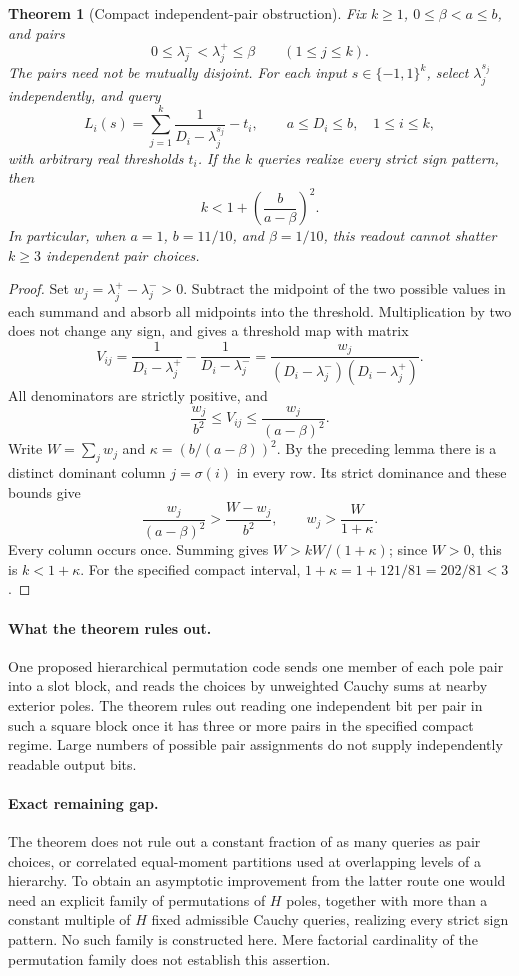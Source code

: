 \documentclass[11pt]{article}
\newtheorem{theorem}{Theorem}
\begin{document}
\begin{theorem}[Compact independent-pair obstruction]
Fix $k\geq1$, $0\leq\beta<a\leq b$, and pairs
\[
 0\leq\lambda_j^-<\lambda_j^+\leq\beta
 \qquad(1\leq j\leq k).
\]
The pairs need not be mutually disjoint. For each input
$s\in\{-1,1\}^k$, select $\lambda_j^{s_j}$ independently, and query
\[
 L_i(s)=\sum_{j=1}^k\frac{1}{D_i-\lambda_j^{s_j}}-t_i,
 \qquad a\leq D_i\leq b,\quad 1\leq i\leq k,
\]
with arbitrary real thresholds $t_i$. If the $k$ queries realize every
strict sign pattern, then
\[
 k<1+\left(\frac{b}{a-\beta}\right)^2.
\]
In particular, when $a=1$, $b=11/10$, and $\beta=1/10$, this readout
cannot shatter $k\geq3$ independent pair choices.
\end{theorem}
\begin{proof}
Set $w_j=\lambda_j^+-\lambda_j^->0$. Subtract the midpoint of the two
possible values in each summand and absorb all midpoints into the
threshold. Multiplication by two does not change any sign, and gives a
threshold map with matrix
\[
 V_{ij}=\frac{1}{D_i-\lambda_j^+}
             -\frac{1}{D_i-\lambda_j^-}
 =\frac{w_j}{(D_i-\lambda_j^-)(D_i-\lambda_j^+)}.
\]
All denominators are strictly positive, and
\[
 \frac{w_j}{b^2}\leq V_{ij}\leq\frac{w_j}{(a-\beta)^2}.
\]
Write $W=\sum_jw_j$ and $\kappa=(b/(a-\beta))^2$.
By the preceding lemma there is a distinct dominant column
$j=\sigma(i)$ in every row. Its strict dominance and these bounds give
\[
 \frac{w_j}{(a-\beta)^2}>
 \frac{W-w_j}{b^2},\qquad
 w_j>\frac{W}{1+\kappa}.
\]
Every column occurs once. Summing gives
$W>kW/(1+\kappa)$; since $W>0$, this is $k<1+\kappa$.
For the specified compact interval,
$1+\kappa=1+121/81=202/81<3$.
\end{proof}

\paragraph{What the theorem rules out.}
One proposed hierarchical permutation code sends one member of each pole
pair into a slot block, and reads the choices by unweighted Cauchy sums at
nearby exterior poles. The theorem rules out reading one independent bit
per pair in such a square block once it has three or more pairs in the
specified compact regime. Large numbers of possible pair assignments do
not supply independently readable output bits.

\paragraph{Exact remaining gap.}
The theorem does not rule out a constant fraction of as many queries as
pair choices, or correlated equal-moment partitions used at overlapping
levels of a hierarchy. To obtain an asymptotic improvement from the latter
route one would need an explicit family of permutations of $H$ poles,
together with more than a constant multiple of $H$ fixed admissible
Cauchy queries, realizing every strict sign pattern. No such family is
constructed here. Mere factorial cardinality of the permutation family
does not establish this assertion.
\end{document}
